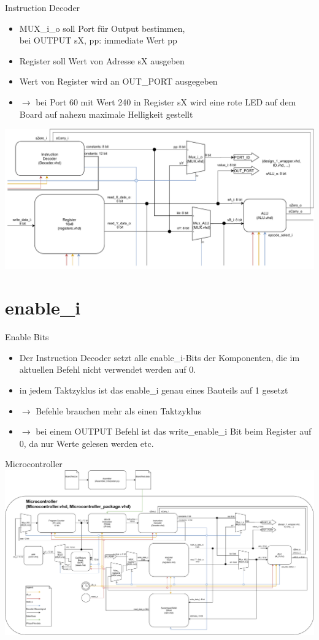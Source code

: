 \documentclass[10pt, t,
aspectratio=169,%
usenames,
dvipsnames,
]{beamer}
\begin{document}
	\begin{frame}{Instruction Decoder}
		\begin{itemize}
			\item MUX\_i\_o soll Port für Output bestimmen, \\ bei OUTPUT sX, pp: immediate Wert pp
			\item Register soll Wert von Adresse sX ausgeben
			\item Wert von Register wird an OUT\_PORT ausgegeben
			\item $\rightarrow$ bei Port 60 mit Wert 240 in Register sX wird eine rote LED auf dem Board auf nahezu maximale Helligkeit gestellt
		\end{itemize}
		\includegraphics[width=.7\linewidth]{../Blockbeschreibungen/IO-BlockdiagramSnipits.pdf}
	\end{frame}
	
	\section{enable\_i}
	
	\begin{frame}{Enable Bits}
		\begin{itemize}
			\item Der Instruction Decoder setzt alle enable\_i-Bits der Komponenten, die im aktuellen Befehl nicht verwendet werden auf 0.
			\item in jedem Taktzyklus ist das enable\_i genau eines Bauteils auf 1 gesetzt
			\item $\rightarrow$ Befehle brauchen mehr als einen Taktzyklus
			\item $\rightarrow$ bei einem OUTPUT Befehl ist das write\_enable\_i Bit beim Register auf 0, da nur Werte gelesen werden etc.
		\end{itemize}
	\end{frame}

	\begin{frame}{Microcontroller}
		\includegraphics[width=.95\linewidth]{../Blockbeschreibungen/BlockdiagramMitVHDL.pdf}
	\end{frame}
\end{document}
